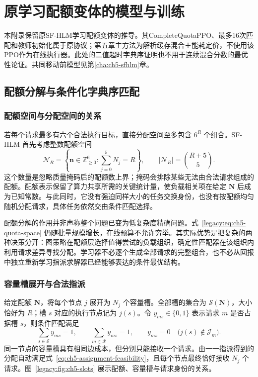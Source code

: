 \chapter{原学习配额变体的模型与训练}
\label{app:legacy-learning}
本附录保留原SF-HLM学习配额变体的推导。其CompleteQuotaPPO、最多16次匹配和教师初始化属于原协议；第五章主方法为解析缓存混合＋能耗定价，不使用该PPO作为在线执行器。此处的二值超时字典序证明也不用于连续混合分数的最优性论证。共同移动前模型见第\ref{cha:ch5-sfhlm}章。

\section{配额分解与条件化字典序匹配}
\label{legacy:sec:ch5-matching}

\subsection{配额空间与分配空间的关系}

若每个请求最多有六个合法执行目标，直接分配空间至多包含 $6^R$ 个组合。SF-HLM 首先考虑整数配额空间
\begin{equation}
 \mathcal{N}_R=\left\{\mathbf{n}\in\mathbb{Z}_{\ge0}^{6}:\sum_{j=0}^{5}N_j=R\right\},
 \qquad |\mathcal{N}_R|=\binom{R+5}{5}.
 \label{legacy:eq:ch5-quota-space}
\end{equation}
这个数量是忽略质量掩码后的配额数上界；掩码会排除某些无法由合法请求组成的配额。配额表示保留了算力共享所需的关键统计量，使负载相关项在给定 $\mathbf N$ 后成为已知常数。与此同时，它没有强迫同样大小的任务交换身份，也没有按配额均匀随机分配请求，具体任务依然交由条件匹配选择。

配额分解的作用并非声称整个问题已变为低复杂度精确问题。式~\eqref{legacy:eq:ch5-quota-space} 仍随批量规模增长，在线预算不允许穷举。其实际优势是把复杂的两种决策分开：图策略在配额层选择值得尝试的负载组织，确定性匹配器在该组织内利用请求差异寻找分配。学习器不必逐个生成全部请求的完整组合，也不必从回报中独立重新学习指派求解器已经能够表达的条件最优结构。

\subsection{容量槽展开与合法指派}

给定配额 $\mathbf N$，将每个节点 $j$ 展开为 $N_j$ 个容量槽。全部槽的集合为 $\mathcal S(\mathbf N)$，大小恰好为 $R$；槽 $s$ 对应的执行节点记为 $j(s)$。令 $y_{ms}\in\{0,1\}$ 表示请求 $m$ 是否占据槽 $s$，则条件匹配满足
\begin{equation}
 \sum_{s\in\mathcal S}y_{ms}=1,\qquad
 \sum_{m\in\mathcal R}y_{ms}=1,\qquad
 y_{ms}=0\quad\bigl(j(s)\notin\mathcal J_m\bigr).
 \label{legacy:eq:ch5-slot-constraints}
\end{equation}
同一节点的容量槽具有相同边成本，但分别只能接收一个请求。由一一指派得到的分配自动满足式~\eqref{eq:ch5-assignment-feasibility}，且每个节点最终恰好接收 $N_j$ 个请求。图~\ref{legacy:fig:ch5-slots} 展示配额、容量槽与请求身份的关系。

